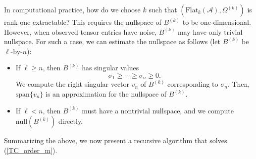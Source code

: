 \documentclass{amsart}
\newcommand{\sig}{\sigma}
\newcommand{\reff}[1]{(\ref{#1})}
\newcommand{\mc}[1]{\mathcal{#1}}
\newcommand{\Span}{\mbox{span}}
\newcommand{\Flat}{\mbox{Flat}}
\newcommand{\bit}{\begin{itemize}}
\newcommand{\eit}{\end{itemize}}
\newcommand{\be}{\begin{equation}}
\newcommand{\ee}{\end{equation}}
\theoremstyle{definition}
\numberwithin{equation}{section}
\begin{document}
In computational practice, how do we choose $k$ such that $(\Flat_k(\mc A),\Omega^{(k)})$ is rank one extractable?
This requires the nullspace of $B^{(k)}$ to be one-dimensional.
However, when observed tensor entries have noise, 
$B^{(k)}$ may have only trivial nullspace.
For such a case, we can estimate the nullspace as follows
(let $B^{(k)}$ be $\ell$-by-$n$):
\bit
\item If $\ell \ge n$, then $B^{(k)}$ has singular values 
\be\label{sigs}
\sig_1 \ge \cdots \ge \sig_n \ge 0.
\ee
We compute the right singular vector $v_n$ of $B^{(k)}$ corresponding to $\sig_n$.
Then, $\Span\{v_n\}$ is an approximation for the nullspace of $B^{(k)}$.

\item If $\ell < n$, then $B^{(k)}$ must have a nontrivial nullspace, 
and we compute $\text{null}(B^{(k)})$ directly.
\eit






Summarizing the above, we now present a recursive algorithm that solves \reff{TC_order_m}.
\end{document}
